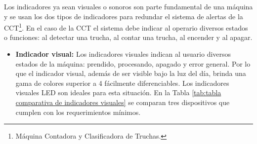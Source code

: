 Los indicadores ya sean visuales o sonoros son parte fundamental de una máquina y se usan los dos tipos de indicadores para redundar el sistema de alertas de la CCT\footnote{Máquina Contadora y Clasificadora de Truchas.}. En el caso de la CCT el sistema debe indicar al operario diversos estados o funciones: al detectar una trucha, al contar una trucha, al encender y al apagar.

\begin{itemize}
	\item \textbf{Indicador visual:} Los indicadores visuales indican al usuario diversos estados de la máquina: prendido, procesando, apagado y error general. Por lo que el indicador visual, además de ser visible bajo la luz del día, brinda una gama de colores superior a 4 fácilmente diferenciables. Los indicadores visuales LED son ideales para esta situación. En la Tabla \ref{tab:tabla comparativa de indicadores visuales} se comparan tres dispositivos que cumplen con los requerimientos mínimos.	
	

\end{itemize}
